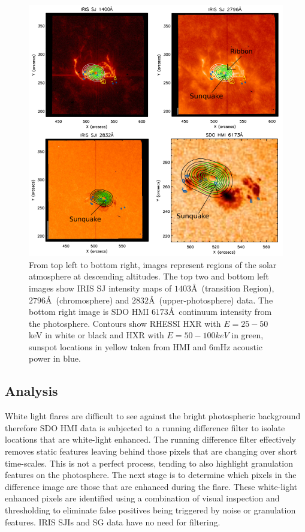 \begin{figure}[H]
  \begin{center}
  \includegraphics[width=1.0\textwidth]{saxcontours-square}
  \end{center}
  \caption{From top left to bottom right, images represent regions of the solar atmosphere at descending altitudes. The top two and bottom left images show IRIS SJ intensity maps of $1403$\AA\ (transition Region), $2796$\AA\ (chromosphere) and $2832$\AA\ (upper-photosphere) data. The bottom right image is SDO HMI $6173$\AA\ continuum intensity from the photosphere. Contours show RHESSI HXR with $E = 25-50$ keV in white or black and HXR with $E = 50-100 keV$ in green, sunspot locations in yellow taken from HMI and 6mHz acoustic power in blue.}\label{saxcontours-vert}
\end{figure}


\subsection{Analysis}


White light flares are difficult to see against the bright photospheric background therefore SDO HMI data is subjected to a running difference filter to isolate locations that are white-light enhanced. The running difference filter effectively removes static features leaving behind those pixels that are changing over short time-scales. This is not a perfect process, tending to also highlight granulation features on the photosphere. The next stage is to determine which pixels in the difference image are those that are enhanced during the flare.  These white-light enhanced pixels are identified using a combination of visual inspection and thresholding to eliminate false positives being triggered by noise or granulation features. IRIS SJIs and SG data have no need for filtering.


